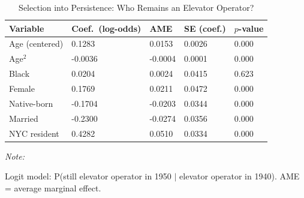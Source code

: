 \begin{table}[!h]
\centering
\caption{Selection into Persistence: Who Remains an Elevator Operator?}
\centering
\begin{threeparttable}
\begin{tabular}[t]{lllll}
\toprule
Variable & Coef.\ (log-odds) & AME & SE (coef.) & $p$-value\\
\midrule
Age (centered) & 0.1283 & 0.0153 & 0.0026 & 0.000\\
Age$^2$ & -0.0036 & -0.0004 & 0.0001 & 0.000\\
Black & 0.0204 & 0.0024 & 0.0415 & 0.623\\
Female & 0.1769 & 0.0211 & 0.0472 & 0.000\\
Native-born & -0.1704 & -0.0203 & 0.0344 & 0.000\\
\addlinespace
Married & -0.2300 & -0.0274 & 0.0356 & 0.000\\
NYC resident & 0.4282 & 0.0510 & 0.0334 & 0.000\\
\bottomrule
\end{tabular}
\begin{tablenotes}
\item \textit{Note: } 
\item Logit model: P(still elevator operator in 1950 $|$ elevator operator in 1940). AME = average marginal effect.
\end{tablenotes}
\end{threeparttable}
\end{table}
